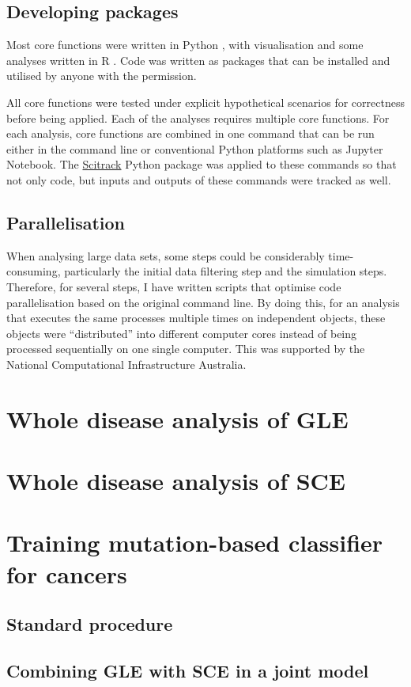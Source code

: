 \subsection{Developing packages}
Most core functions were written in Python \citep{van1995python}, with visualisation and some analyses written in R \citep{r}. Code was written as packages that can be installed and utilised by anyone with the permission. 

All core functions were tested under explicit hypothetical scenarios for correctness before being applied. Each of the analyses requires multiple core functions. For each analysis, core functions are combined in one command that can be run either in the command line or conventional Python platforms such as Jupyter Notebook. The \href{https://github.com/HuttleyLab/scitrack}{Scitrack} Python package was applied to these commands so that not only code, but inputs and outputs of these commands were tracked as well.

\subsection{Parallelisation}
When analysing large data sets, some steps could be considerably time-consuming, particularly the initial data filtering step and the simulation steps. Therefore, for several steps, I have written scripts that optimise code parallelisation based on the original command line. By doing this, for an analysis that executes the same processes multiple times on independent objects, these objects were ``distributed'' into different computer cores instead of being processed sequentially on one single computer. This was supported by the National Computational Infrastructure Australia.


\section{Whole disease analysis of GLE}
\section{Whole disease analysis of SCE}
\section{Training mutation-based classifier for cancers}
\subsection{Standard procedure}
\label{methods:ml}
\subsection{Combining GLE with SCE in a joint model}
